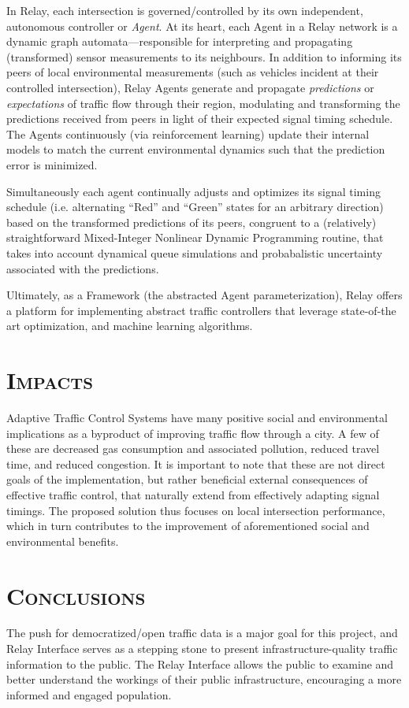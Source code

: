 \documentclass[a4paper,10pt]{article}
\begin{document}
\begin{multicols}{2}
In Relay, each intersection is governed/controlled by its own independent, autonomous controller or \emph{Agent}.
At its heart, each Agent in a Relay network is a dynamic graph automata---responsible for interpreting and propagating (transformed) sensor measurements to its neighbours.
In addition to informing its peers of local environmental measurements (such as vehicles incident at their controlled intersection), Relay Agents generate and propagate \emph{predictions} or \emph{expectations} of traffic flow through their region, modulating and transforming the predictions received from peers in light of their expected signal timing schedule.
The Agents continuously (via reinforcement learning) update their internal models to match the current environmental dynamics such that the prediction error is minimized.

Simultaneously each agent continually adjusts and optimizes its signal timing schedule (i.e. alternating ``Red'' and ``Green'' states for an arbitrary direction) based on the transformed predictions of its peers, congruent to a (relatively) straightforward Mixed-Integer Nonlinear Dynamic Programming routine, that takes into account dynamical queue simulations and probabalistic uncertainty associated with the predictions.

Ultimately, as a Framework (the abstracted Agent parameterization), Relay offers a platform for implementing abstract traffic controllers that leverage state-of-the art optimization, and machine learning algorithms.

\section{\textsc{Impacts}}
Adaptive Traffic Control Systems have many positive social and environmental implications as a byproduct of improving traffic flow through a city.
A few of these are decreased gas consumption and associated pollution, reduced travel time, and reduced congestion.
It is important to note that these are not direct goals of the implementation, but rather beneficial external consequences of effective traffic control, that naturally extend from effectively adapting signal timings.
The proposed solution thus focuses on local intersection performance, which in turn contributes to the improvement of aforementioned social and environmental benefits.

\section{\textsc{Conclusions}}
The push for democratized/open traffic data is a major goal for this project, and Relay Interface serves as a stepping stone to present infrastructure-quality traffic information to the public. 
The Relay Interface allows the public to examine and better understand the workings of their public infrastructure, encouraging a more informed and engaged population.


\end{multicols}
\end{document}
